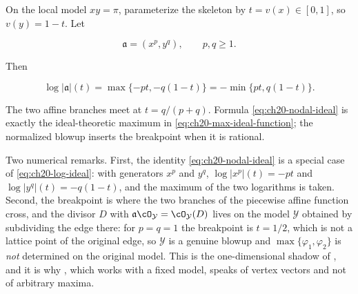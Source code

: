 \begin{example}
\label{ex:ch20-nodal-max}
On the local model \(xy=\pi\), parameterize the skeleton by
\(t=v(x)\in[0,1]\), so \(v(y)=1-t\).  Let

\[
              \mathfrak a=(x^p,y^q),\qquad p,q\geq1.
\]

Then

\begin{equation}
\label{eq:ch20-nodal-ideal}
 \log|\mathfrak a|(t)
   =\max\{-pt,-q(1-t)\}
   =-\min\{pt,q(1-t)\}.
\end{equation}

The two affine branches meet at \(t=q/(p+q)\).  Formula
\eqref{eq:ch20-nodal-ideal} is exactly the ideal-theoretic maximum in
\eqref{eq:ch20-max-ideal-function}; the normalized blowup inserts the
breakpoint when it is rational.

Two numerical remarks.  First, the identity
\eqref{eq:ch20-nodal-ideal} is a special case of
\eqref{eq:ch20-log-ideal}: with generators \(x^p\) and \(y^q\),
\(\log|x^p|(t)=-pt\) and \(\log|y^q|(t)=-q(1-t)\), and the maximum of the
two logarithms is taken.  Second, the breakpoint is where the two branches
of the piecewise affine function cross, and the divisor \(D\) with
\(\mathfrak a\cO_{\mathcal Y}=\cO_{\mathcal Y}(D)\) lives on the model
\(\mathcal Y\) obtained by subdividing the edge there: for
\(p=q=1\) the breakpoint is \(t=1/2\), which is not a lattice point of the
original edge, so \(\mathcal Y\) is a genuine blowup and
\(\max\{\varphi_1,\varphi_2\}\) is \emph{not} determined on the original
model.  This is the one-dimensional shadow of
, and it is why
, which works with a fixed model, speaks of
vertex vectors and not of arbitrary maxima.
\end{example}

